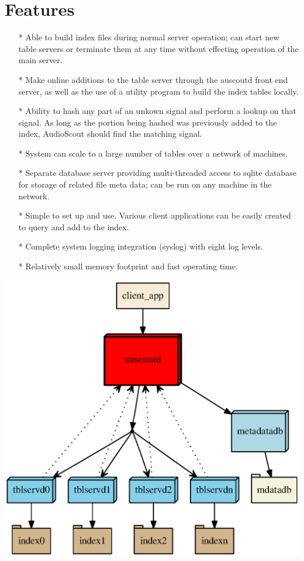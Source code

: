 \documentclass[11pt, a4paper]{article}
\begin{document}
\section{Features}
\flushleft
\begin{itemize}
\item[*] Able to build index files during normal server operation; can start new 
table servers or terminate them at any time without effecting operation of the main server.
\item[*] Make online additions to the table server through the auscoutd front end server, as well
as the use of a utility program to build the index tables locally.
\item[*] Ability to hash any part of an unkown signal and perform a lookup on that signal. As
long as the portion being hashed was previously added to the index, AudioScout should find
the matching signal.   
\item[*] System can scale to a large number of tables over a network  of machines.
\item[*] Separate database server providing multi-threaded access to sqlite database 
for storage of related file meta data; can be run on any machine in the network.
\item[*] Simple to set up and use.  Various client applications can be easily created to query 
and add to the index. 
\item[*] Complete system logging integration (syslog) with eight log levels.
\item[*] Relatively small memory footprint and fast operating time.
\end{itemize}

\includegraphics{audioscout.eps}
\newpage
\end{document}
